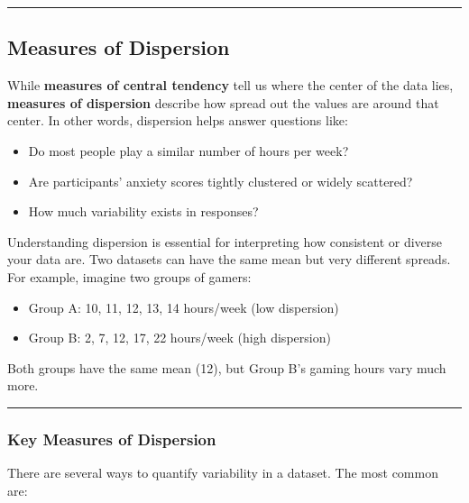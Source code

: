 \documentclass[
]{book}
\providecommand{\tightlist}{%
  \setlength{\itemsep}{0pt}\setlength{\parskip}{0pt}}
\begin{document}
\begin{center}\rule{0.5\linewidth}{0.5pt}\end{center}

\subsection*{\texorpdfstring{\textbf{Measures of Dispersion}}{Measures of Dispersion}}\label{measures-of-dispersion}

While \textbf{measures of central tendency} tell us where the center of the data lies, \textbf{measures of dispersion} describe how spread out the values are around that center. In other words, dispersion helps answer questions like:

\begin{itemize}
\tightlist
\item
  Do most people play a similar number of hours per week?
\item
  Are participants' anxiety scores tightly clustered or widely scattered?
\item
  How much variability exists in responses?
\end{itemize}

Understanding dispersion is essential for interpreting how consistent or diverse your data are. Two datasets can have the same mean but very different spreads. For example, imagine two groups of gamers:

\begin{itemize}
\tightlist
\item
  Group A: 10, 11, 12, 13, 14 hours/week (low dispersion)
\item
  Group B: 2, 7, 12, 17, 22 hours/week (high dispersion)
\end{itemize}

Both groups have the same mean (12), but Group B's gaming hours vary much more.

\begin{center}\rule{0.5\linewidth}{0.5pt}\end{center}

\subsubsection*{Key Measures of Dispersion}\label{key-measures-of-dispersion}

There are several ways to quantify variability in a dataset. The most common are:
\end{document}
